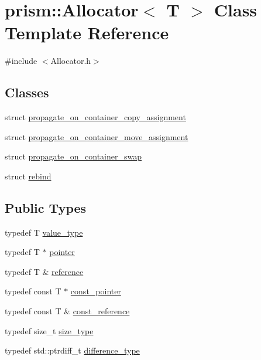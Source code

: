 \hypertarget{classprism_1_1_allocator}{}\section{prism\+:\+:Allocator$<$ T $>$ Class Template Reference}
\label{classprism_1_1_allocator}


{\ttfamily \#include $<$Allocator.\+h$>$}

\subsection*{Classes}
\begin{DoxyCompactItemize}
\item 
struct \hyperlink{structprism_1_1_allocator_1_1propagate__on__container__copy__assignment}{propagate\+\_\+on\+\_\+container\+\_\+copy\+\_\+assignment}
\item 
struct \hyperlink{structprism_1_1_allocator_1_1propagate__on__container__move__assignment}{propagate\+\_\+on\+\_\+container\+\_\+move\+\_\+assignment}
\item 
struct \hyperlink{structprism_1_1_allocator_1_1propagate__on__container__swap}{propagate\+\_\+on\+\_\+container\+\_\+swap}
\item 
struct \hyperlink{structprism_1_1_allocator_1_1rebind}{rebind}
\end{DoxyCompactItemize}
\subsection*{Public Types}
\begin{DoxyCompactItemize}
\item 
typedef T \hyperlink{classprism_1_1_allocator_a45426ee64e0aba097a532e0ef5ff5700}{value\+\_\+type}
\item 
typedef T $\ast$ \hyperlink{classprism_1_1_allocator_ad3c6706a7243bd3ef489e16d34d5750f}{pointer}
\item 
typedef T \& \hyperlink{classprism_1_1_allocator_a5dde9876d2ed0ca292d8a2019ac2836f}{reference}
\item 
typedef const T $\ast$ \hyperlink{classprism_1_1_allocator_af6a4a91dfc203203ecc319a457ce4dce}{const\+\_\+pointer}
\item 
typedef const T \& \hyperlink{classprism_1_1_allocator_a89911899c97ae877a81b798957a2d899}{const\+\_\+reference}
\item 
typedef size\+\_\+t \hyperlink{classprism_1_1_allocator_a47cb9435e4e9ff4c934ea3d4b4338d52}{size\+\_\+type}
\item 
typedef std\+::ptrdiff\+\_\+t \hyperlink{classprism_1_1_allocator_a39ca38c4c741bbc51d3c6e26603102ef}{difference\+\_\+type}
\end{DoxyCompactItemize}
